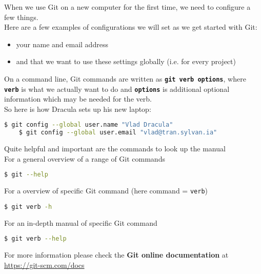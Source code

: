 \begin{frame}[fragile]
\emptyframetitle
  When we use Git on a new computer for the first time, we need to configure a few things.\\[0.25cm]

  Here are a few examples of configurations we will set as we get started with Git:
  \begin{itemize}
    \item your name and email address
    \item and that we want to use these settings globally (i.e. for every project)
  \end{itemize}
  On a command line, Git commands are written as \texttt{\textbf{git verb options}}, where \texttt{\textbf{verb}} is what we actually want to do and \texttt{\textbf{options}} is additional optional information which may be needed for the verb.\\[0.25cm]

  So here is how Dracula sets up his new laptop:

  \begin{lstlisting}[language=bash]
    $ git config --global user.name "Vlad Dracula"
    $ git config --global user.email "vlad@tran.sylvan.ia"
  \end{lstlisting}

\end{frame}

\begin{frame}[fragile]
\emptyframetitle

  Quite helpful and important are the commands to look up the manual\\[0.25cm] 

  For a general overview of a range of Git commands
  \begin{lstlisting}[language=bash]
    $ git --help
  \end{lstlisting}

  For a overview of specific Git command (here command = \texttt{verb})
  \begin{lstlisting}[language=bash]
    $ git verb -h
  \end{lstlisting}

  For an in-depth manual of specific Git command
  \begin{lstlisting}[language=bash]
    $ git verb --help
  \end{lstlisting}

  \vspace*{0.5cm}
  For more information please check the \textbf{Git online documentation} at
  \url{https://git-scm.com/docs}

\end{frame}

